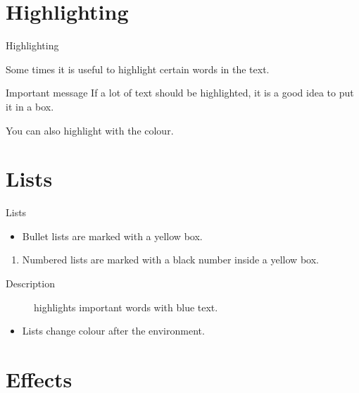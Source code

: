 \documentclass[UKenglish]{beamer}
\begin{document}
\section{Highlighting}

\begin{frame}{Highlighting}

    Some times it is useful to \alert{highlight} certain words in the text.

    \begin{alertblock}{Important message}
        If a lot of text should be \alert{highlighted}, it is a good idea to put it in a box.
    \end{alertblock}

    You can also highlight with the  colour.
\end{frame}

\section{Lists}

\begin{frame}{Lists}

    \begin{itemize}
        \item
        Bullet lists are marked with a yellow box.
    \end{itemize}

    \begin{enumerate}
        \item
        Numbered lists are marked with a black number inside a yellow box.
    \end{enumerate}

    \begin{description}
        \item[Description] highlights important words with blue text.
    \end{description}

    \begin{example}
        \begin{itemize}
            \item
            Lists change colour after the environment.
        \end{itemize}
    \end{example}
\end{frame}

\section{Effects}
\end{document}
